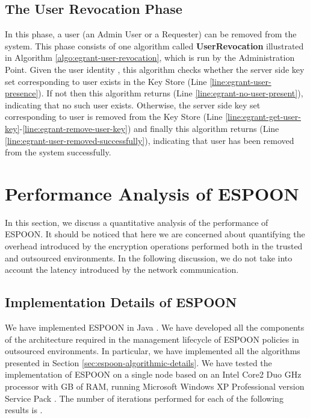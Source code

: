 \documentclass[epsfig,a4paper,11pt,titlepage]{book}
\numberwithin{algorithm}{chapter}
\begin{document}
\subsection{The User Revocation Phase}
In this phase, a user (an Admin User or a Requester) can be removed from the system. This phase consists of one algorithm called \textbf{UserRevocation} illustrated in Algorithm \ref{algo:egrant-user-revocation}, which is run by the Administration Point. Given the user identity , this algorithm checks whether the server side key set corresponding to user  exists in the Key Store (Line \ref{line:egrant-user-presence}). If not then this algorithm returns  (Line \ref{line:egrant-no-user-present}), indicating that no such user exists. Otherwise, the server side key set  corresponding to user  is removed from the Key Store (Line \ref{line:egrant-get-user-key}-\ref{line:egrant-remove-user-key}) and finally this algorithm returns  (Line \ref{line:egrant-user-removed-successfully}), indicating that user  has been removed from the system successfully.

\section[Performance Analysis of ESPOON]{Performance Analysis of \gls{ESPOON}}
\label{sec:espoon-performance-analysis}
In this section, we discuss a quantitative analysis of the performance of \gls{ESPOON}. It should be noticed that here we are concerned about quantifying the overhead introduced by the encryption operations performed both in the trusted and outsourced environments. In the following discussion, we do not take into account the latency introduced by the network communication.

\subsection[Implementation Details of ESPOON]{Implementation Details of \gls{ESPOON}}
We have implemented \gls{ESPOON} in Java . We have developed all the components of the architecture required in the management lifecycle of \gls{ESPOON} policies in outsourced environments. In particular, we have implemented all the algorithms presented in Section \ref{sec:espoon-algorithmic-details}. We have tested the implementation of \gls{ESPOON} on a single node based on an Intel Core2 Duo  GHz processor with  GB of RAM, running Microsoft Windows XP Professional version  Service Pack . The number of iterations performed for each of the following results is .
\end{document}
